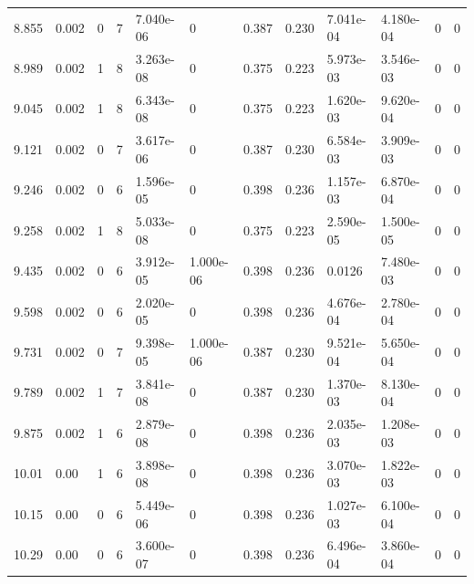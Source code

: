 \documentclass[preview]{standalone}
\begin{document}
{{\begin{tabular}{L{1.2cm}C{1.2cm} C{0.3cm}C{0.5cm} C{1.4cm}C{1.4cm} C{1.4cm}C{1.4cm} C{1.6cm}C{1.6cm} C{1.6cm}C{1.6cm}}
  8.855  &  0.002  & 0     &  7 &  7.040e-06  & 0  &  0.387&   0.230& 7.041e-04 & 4.180e-04   &  0 & 0  \\ 
  8.989  &  0.002  & 1     &  8 &  3.263e-08  & 0  &  0.375&   0.223& 5.973e-03 & 3.546e-03   &  0 & 0  \\ 
  9.045  &  0.002  & 1     &  8 &  6.343e-08  & 0  &  0.375&   0.223& 1.620e-03 & 9.620e-04   &  0 & 0  \\ 
  9.121  &  0.002  & 0     &  7 &  3.617e-06  & 0  &  0.387&   0.230& 6.584e-03 & 3.909e-03   &  0 & 0  \\ 
  9.246  &  0.002  & 0     &  6 &  1.596e-05  & 0  &  0.398&   0.236& 1.157e-03 & 6.870e-04   &  0 & 0  \\ 
  9.258  &  0.002  & 1     &  8 &  5.033e-08  & 0  &  0.375&   0.223& 2.590e-05 & 1.500e-05   &  0 & 0  \\ 
  9.435  &  0.002  & 0     &  6 &  3.912e-05  & 1.000e-06  &  0.398&   0.236& 0.0126 & 7.480e-03   &  0 & 0  \\ 
  9.598  &  0.002  & 0     &  6 &  2.020e-05  & 0  &  0.398&   0.236& 4.676e-04 & 2.780e-04   &  0 & 0  \\ 
  9.731  &  0.002  & 0     &  7 &  9.398e-05  & 1.000e-06  &  0.387&   0.230& 9.521e-04 & 5.650e-04   &  0 & 0  \\ 
  9.789  &  0.002  & 1     &  7 &  3.841e-08  & 0  &  0.387&   0.230& 1.370e-03 & 8.130e-04   &  0 & 0  \\ 
  9.875  &  0.002  & 1     &  6 &  2.879e-08  & 0  &  0.398&   0.236& 2.035e-03 & 1.208e-03   &  0 & 0  \\ 
  10.01  &  0.00  & 1     &  6 &  3.898e-08  & 0  &  0.398&   0.236& 3.070e-03 & 1.822e-03   &  0 & 0  \\ 
  10.15  &  0.00  & 0     &  6 &  5.449e-06  & 0  &  0.398&   0.236& 1.027e-03 & 6.100e-04   &  0 & 0  \\ 
  10.29  &  0.00  & 0     &  6 &  3.600e-07  & 0  &  0.398&   0.236& 6.496e-04 & 3.860e-04   &  0 & 0  \\ 
\hline 
\end{tabular} 

}}
\end{document}

